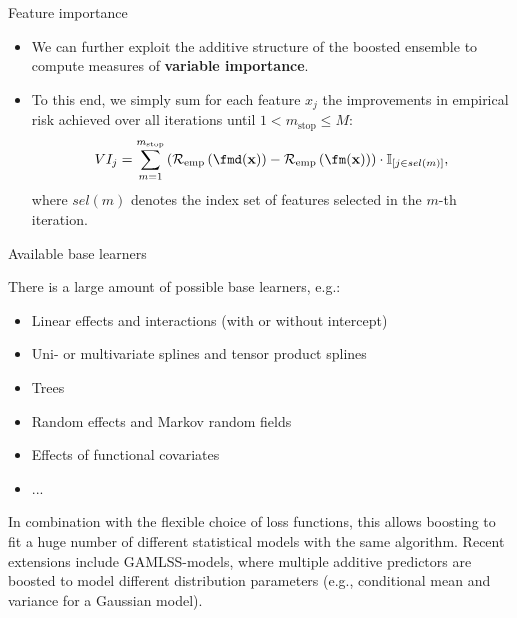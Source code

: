 \begin{vbframe}{Feature importance}
\begin{itemize}
  \item We can further exploit the additive structure of the boosted ensemble to 
  compute measures of \textbf{variable importance}.
  \item To this end, we simply sum for each feature $x_j$ the improvements in 
  empirical risk achieved over all iterations until 
  $1 < m_{\text{stop}} \leq M$:
    $$VI_j = \sum_{m = 1}^{m_{\text{stop}}} \left( \riske \left(
    \fmd(\xv) \right) - \riske \left(\fm(\xv) 
    \right) \right) \cdot \I_{[j \in sel(m)]},$$
  where $sel(m)$ denotes the index set of features selected in the $m$-th 
  iteration.
\end{itemize}

\end{vbframe}

\begin{vbframe}{Available base learners}

There is a large amount of possible base learners, e.g.:

\begin{itemize}
  \item Linear effects and interactions (with or without intercept)
  \item Uni- or multivariate splines and tensor product splines
  \item Trees
  \item Random effects and Markov random fields
  \item Effects of functional covariates
  \item ...
\end{itemize}

\lz

In combination with the flexible choice of loss functions, this allows boosting to fit  a huge number of different statistical models with the same algorithm. Recent extensions include GAMLSS-models, where multiple additive predictors are boosted to model different distribution parameters (e.g., conditional mean and variance for a Gaussian model).

\end{vbframe}



